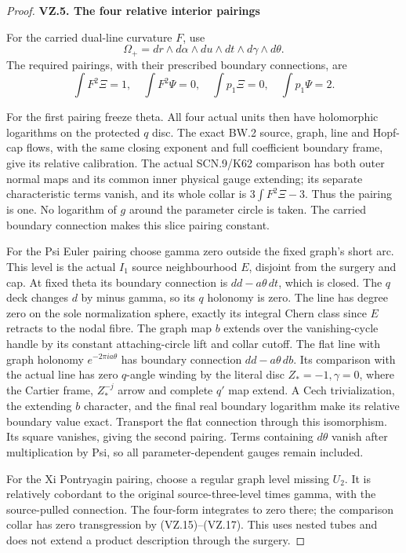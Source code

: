 \begin{proof}
\par

\medskip\noindent\textbf{VZ.5. The four relative interior pairings}

\par\nobreak

For the carried dual-line curvature \(F\), use
\[
 \Omega_+=dr\wedge d\alpha\wedge du\wedge dt
                  \wedge d\gamma\wedge d\theta.      \tag{VZ.18}
\]
The required pairings, with their prescribed boundary connections, are
\[
 \int F^2\Xi=1,\quad \int F^2\Psi=0,\quad
 \int p_1\Xi=0,\quad \int p_1\Psi=2.                 \tag{VZ.19}
\]

For the first pairing freeze theta. All four actual units then have
holomorphic logarithms on the protected \(q\) disc. The exact BW.2
source, graph, line and Hopf-cap flows, with the same closing exponent
and full coefficient boundary frame, give its relative calibration.
The actual SCN.9/K62 comparison has both outer normal maps and its
common inner physical gauge extending; its separate characteristic
terms vanish, and its whole collar is \(3\int F^2\Xi-3\).
Thus the pairing is one. No logarithm of \(g\) around the parameter
circle is taken. The carried boundary connection makes this slice
pairing constant.

For the Psi Euler pairing choose gamma zero outside the fixed graph's
short arc. This level is the actual \(I_1\) source neighbourhood \(E\),
disjoint from the surgery and cap. At fixed theta its boundary
connection is \(dd-a\theta\,dt\), which is closed. The \(q\) deck
changes \(d\) by minus gamma, so its \(q\) holonomy is zero. The line
has degree zero on the sole normalization sphere, exactly its integral
Chern class since \(E\) retracts to the nodal fibre.
The graph map \(b\) extends over the vanishing-cycle handle by its
constant attaching-circle lift and collar cutoff. The flat line with
graph holonomy \(e^{-2\pi ia\theta}\) has boundary connection
\(dd-a\theta\,db\). Its comparison with the actual line has zero
\(q\)-angle winding by the literal disc \(Z_*=-1,\gamma=0\), where
the Cartier frame, \(Z_*^{-j}\) arrow and complete \(q'\) map extend.
A Cech trivialization, the extending \(b\) character, and the final
real boundary logarithm make its relative boundary value exact.
Transport the flat connection through this isomorphism. Its square
vanishes, giving the second pairing. Terms containing \(d\theta\)
vanish after multiplication by Psi, so all parameter-dependent gauges
remain included.

For the Xi Pontryagin pairing, choose a regular graph level missing
\(U_2\). It is relatively cobordant to the original source-three-level
times gamma, with the source-pulled connection. The four-form integrates
to zero there; the comparison collar has zero transgression by
(VZ.15)--(VZ.17). This uses nested tubes and does not extend a product
description through the surgery.


\end{proof}

